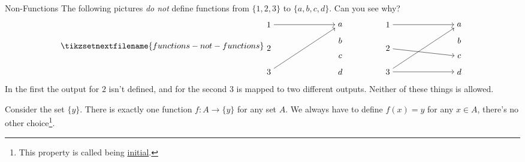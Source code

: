 \documentclass[fleqn]{LectureClass/LectureClass}
\begin{document}
    \begin{exm}{Non-Functions}{}
        The following pictures \emph{do not} define functions from \(\{1, 2, 3\}\) to \(\{a, b, c, d\}\).
        Can you see why?
        \begin{equation}
            \label{eqn:function example not injective}
            \tikzsetnextfilename{functions-not-functions}
            \begin{tikzpicture}[baseline=(current bounding box)]
                \node (n1) at (0, 2) {\(1\)};
                \node (n2) at (0, 1) {\(2\)};
                \node (n3) at (0, 0) {\(3\)};
                \node (a) at (3, 2) {\(a\)};
                \node (b) at (3, 1.33) {\(b\)};
                \node (c) at (3, 0.66) {\(c\)};
                \node (d) at (3, 0) {\(d\)};
                \draw [->] (n1) -- (a);
                \draw [->] (n3) -- (a);
                
                \begin{scope}[xshift=5cm]
                    \node (n1) at (0, 2) {\(1\)};
                    \node (n2) at (0, 1) {\(2\)};
                    \node (n3) at (0, 0) {\(3\)};
                    \node (a) at (3, 2) {\(a\)};
                    \node (b) at (3, 1.33) {\(b\)};
                    \node (c) at (3, 0.66) {\(c\)};
                    \node (d) at (3, 0) {\(d\)};
                    \draw [->] (n1) -- (a);
                    \draw [->] (n2) -- (c);
                    \draw [->] (n3) -- (d);
                    \draw [->] (n3) -- (a);
                \end{scope}
            \end{tikzpicture}
        \end{equation}
        In the first the output for \(2\) isn't defined, and for the second \(3\) is mapped to two different outputs.
        Neither of these things is allowed.
    \end{exm}
    
    \begin{exm}{}{}
        Consider the set \(\{y\}\).
        There is exactly one function \(f \colon A \to \{y\}\) for any set \(A\).
        We always have to define \(f(x) = y\) for any \(x \in A\), there's no other choice\footnote{This property is called being \href{https://en.wikipedia.org/wiki/Initial_and_terminal_objects}{initial}.}.
    \end{exm}
    
\end{document}
